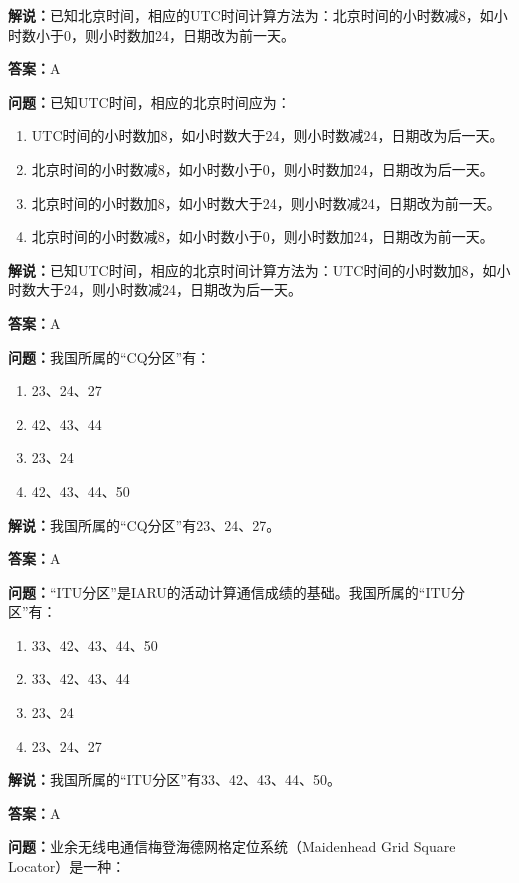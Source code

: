 \documentclass[UTF8]{ctexbook}
\begin{document}
\textbf{解说：}已知北京时间，相应的UTC时间计算方法为：北京时间的小时数减8，如小时数小于0，则小时数加24，日期改为前一天。

\textbf{答案：}A

\textbf{问题：}已知UTC时间，相应的北京时间应为：

\begin{enumerate}[label=\Alph*), leftmargin=3em]
  \item UTC时间的小时数加8，如小时数大于24，则小时数减24，日期改为后一天。
  \item 北京时间的小时数减8，如小时数小于0，则小时数加24，日期改为后一天。
  \item 北京时间的小时数加8，如小时数大于24，则小时数减24，日期改为前一天。
  \item 北京时间的小时数减8，如小时数小于0，则小时数加24，日期改为前一天。
\end{enumerate}

\textbf{解说：}已知UTC时间，相应的北京时间计算方法为：UTC时间的小时数加8，如小时数大于24，则小时数减24，日期改为后一天。

\textbf{答案：}A

\textbf{问题：}我国所属的“CQ分区”有：

\begin{enumerate}[label=\Alph*), leftmargin=3em]
  \item 23、24、27
  \item 42、43、44
  \item 23、24
  \item 42、43、44、50
\end{enumerate}

\textbf{解说：}我国所属的“CQ分区”有23、24、27。

\textbf{答案：}A

\textbf{问题：}“ITU分区”是IARU的活动计算通信成绩的基础。我国所属的“ITU分区”有：

\begin{enumerate}[label=\Alph*), leftmargin=3em]
  \item 33、42、43、44、50
  \item 33、42、43、44
  \item 23、24
  \item 23、24、27
\end{enumerate}

\textbf{解说：}我国所属的“ITU分区”有33、42、43、44、50。

\textbf{答案：}A

\textbf{问题：}业余无线电通信梅登海德网格定位系统（Maidenhead Grid Square Locator）是一种：
\end{document}
